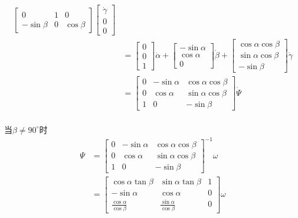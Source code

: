 \documentclass[UTF8, 12pt]{ctexart}
\begin{document}
\[\begin{aligned}
\begin{bmatrix}
            0 & 1 & 0 \\
            -\sin\beta & 0 & \cos\beta
        \end{bmatrix}
        \begin{bmatrix}
            \dot{\gamma} \\
            0 \\
            0 
        \end{bmatrix} \\
    &= \begin{bmatrix}
        0 \\
        0 \\
        1
        \end{bmatrix} \dot{\alpha}
        + \begin{bmatrix}
            -\sin\alpha \\
            \cos\alpha \\
            0
        \end{bmatrix} \dot{\beta}
        + \begin{bmatrix}
            \cos\alpha \cos\beta \\
            \sin\alpha \cos\beta \\
            -\sin\beta
        \end{bmatrix} \dot{\gamma} \\
    &= \begin{bmatrix}
        0 & -\sin\alpha & \cos\alpha \cos\beta \\
        0 & \cos\alpha & \sin\alpha \cos\beta \\
        1 & 0 & -\sin\beta
        \end{bmatrix} \dot{\Psi} \\
\end{aligned}
\]

当\(\beta \neq 90^\circ\)时
\[
\begin{aligned}
    \Psi &= \begin{bmatrix}
        0 & -\sin\alpha & \cos\alpha \cos\beta \\
        0 & \cos\alpha & \sin\alpha \cos\beta \\
        1 & 0 & -\sin\beta
        \end{bmatrix}^{-1} \omega \\
    &= \begin{bmatrix}
            \cos\alpha \tan\beta & \sin\alpha \tan\beta & 1 \\
            -\sin\alpha & \cos\alpha & 0 \\
            \frac{\cos\alpha}{\cos\beta} & \frac{\sin\alpha}{\cos\beta} & 0
        \end{bmatrix} \omega \\
\end{aligned}
\]
\end{document}
